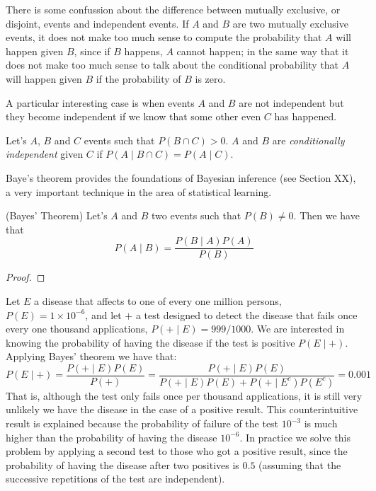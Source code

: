 \begin{example}
There is some confussion about the difference between mutually exclusive, or disjoint, events and independent events. If $A$ and $B$ are two mutually exclusive events, it does not make too much sense to compute the probability that $A$ will happen given $B$, since if $B$ happens, $A$ cannot happen; in the same way that it does not make too much sense to talk about the conditional probability that $A$ will happen given $B$ if the probability of $B$ is zero.
\end{example}

A particular interesting case is when events $A$ and $B$ are not independent but they become independent if we know that some other even $C$ has happened. 

\begin{definition}
Let's $A$, $B$ and $C$ events such that $P\left( B \cap C \right)>0$. $A$ and $B$ are \emph{conditionally independent} given $C$ if $P\left(A \mid B \cap C \right) = P\left( A \mid C \right)$.
\end{definition}

Baye's theorem provides the foundations of Bayesian inference (see Section XX), a very important technique in the area of statistical learning.

\begin{theorem} (Bayes' Theorem) Let's $A$ and $B$ two events such that $P\left( B \right) \neq 0$. Then we have that
\[
P \left( A \mid B \right) = \frac{P \left( B \mid A \right) P \left( A \right)}{P \left( B \right)}
\]
\end{theorem}
\begin{proof}
\end{proof}

\begin{example}
Let $E$ a disease that affects to one of every one million persons, $P(E) = 1 \times 10^{-6}$, and let $+$ a test designed to detect the disease that fails once every one thousand applications, $P(+ \mid E) = 999/1000$. We are interested in knowing the probability of having the disease if the test is positive $P(E \mid +)$. Applying Bayes' theorem we have that:
\[
P(E \mid +) = \frac{P(+ \mid E) P(E)}{P(+)} = \frac{P(+ \mid E) P(E)}{P(+ \mid E) P(E) + P(+ \mid E^c) P(E^c)} = 0.001
\]
That is, although the test only fails once per thousand applications, it is still very unlikely we have the disease in the case of a positive result. This counterintuitive result is explained because the probability of failure of the test $10^{-3}$ is much higher than the probability of having the disease $10^{-6}$. In practice we solve this problem by applying a second test to those who got a positive result, since the probability of having the disease after two positives is $0.5$ (assuming that the successive repetitions of the test are independent).
\end{example}

